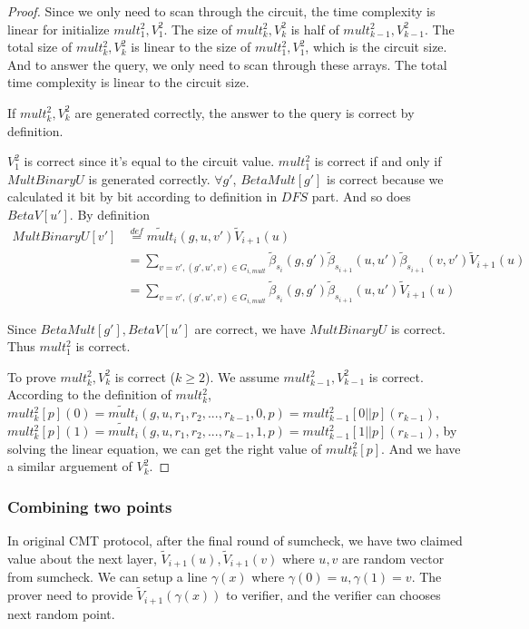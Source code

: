 \begin{proof}
Since we only need to scan through the circuit, the time complexity is linear for initialize $mult_{1}^2, V_1^2$. The size of $mult_{k}^2, V_k^2$ is half of $mult_{k-1}^2, V_{k-1}^2$. The total size of $mult_{k}^2, V_k^2$ is linear to the size of $mult_1^2, V_1^2$, which is the circuit size. And to answer the query, we only need to scan through these arrays. The total time complexity is linear to the circuit size.

If $mult_k^2, V_k^2$ are generated correctly, the answer to the query is correct by definition.

$V_1^2$ is correct since it's equal to the circuit value. $mult_1^2$ is correct if and only if $MultBinaryU$ is generated correctly. $\forall g'$, $BetaMult[g']$ is correct because we calculated it bit by bit according to definition in $DFS$ part. And so does $BetaV[u']$. By definition 
\begin{align*}
MultBinaryU[v']&\overset{def}{=}\tilde{mult}_{i}(g, u, v')\tilde{V}_{i+1}(u)
\\&=\sum_{v=v', (g', u', v) \in G_{i, mult}}\tilde{\beta}_{s_{i}}(g, g')\tilde{\beta}_{s_{i+1}}(u, u')\tilde{\beta}_{s_{i+1}}(v, v')\tilde{V}_{i+1}(u)
\\&=\sum_{v=v', (g', u', v) \in G_{i, mult}}\tilde{\beta}_{s_{i}}(g, g')\tilde{\beta}_{s_{i+1}}(u, u')\tilde{V}_{i+1}(u)
\end{align*}

Since $BetaMult[g'], BetaV[u']$ are correct, we have $MultBinaryU$ is correct. Thus $mult_1^2$ is correct.

To prove $mult_k^2, V_k^2$ is correct ($k \ge 2$). We assume $mult_{k-1}^2, V_{k-1}^2$ is correct. According to the definition of $mult_k^2$, $mult_k^2[p](0)=\tilde{mult}_i(g, u, {r_1, r_2,...,r_{k-1}, 0, p})=mult_{k-1}^2[0||p](r_{k-1})$, $mult_k^2[p](1)=\tilde{mult}_i(g, u, {r_1, r_2,...,r_{k-1}, 1, p})=mult_{k-1}^2[1||p](r_{k-1})$, by solving the linear equation, we can get the right value of $mult_k^2[p]$. And we have a similar arguement of $V_k^2$.
\end{proof}

\subsubsection{Combining two points}
In original CMT protocol, after the final round of sumcheck, we have two claimed value about the next layer, $\tilde{V}_{i+1}(u), \tilde{V}_{i+1}(v)$ where $u, v$ are random vector from sumcheck. We can setup a line $\gamma(x)$ where $\gamma(0) = u, \gamma(1)=v$. The prover need to provide $\tilde{V}_{i+1}(\gamma(x))$ to verifier, and the verifier can chooses next random point.

